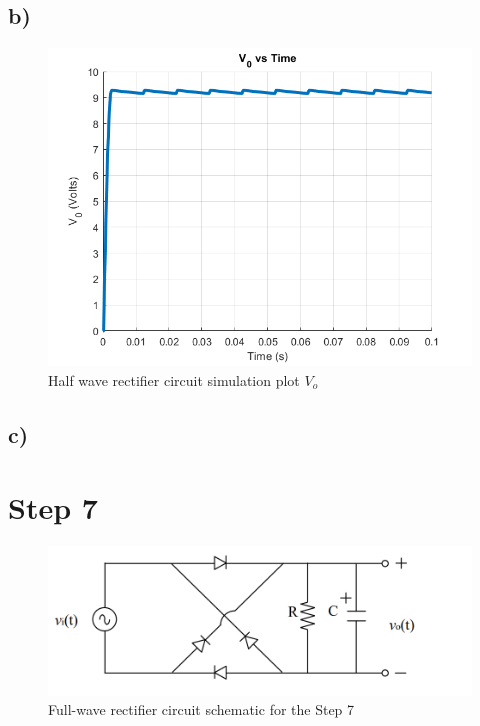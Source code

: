 \documentclass[letterpaper,12pt]{article}
\begin{document}
\subsection{b)}
\begin{figure}[H]
    \centering
   \includegraphics[width=1\textwidth]{6.png}
   \caption{Half wave rectifier circuit simulation plot \(V_o\) }
\end{figure} 
\subsection{c)}

\section{Step 7}

\begin{figure}[H]
    \centering
   \includegraphics[width=1\textwidth]{7_1.png}
   \caption{Full-wave rectifier circuit schematic for the Step 7}
\end{figure} 
\end{document}
